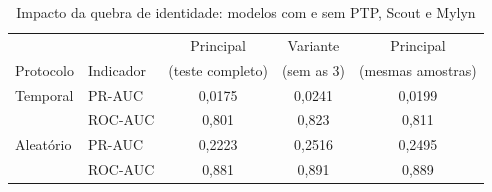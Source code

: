 \begin{table}[htbp]
    \centering
    \footnotesize
    \caption{Impacto da quebra de identidade: modelos com e sem PTP, Scout e Mylyn}
    \label{tab:res-sensibilidade}
    \begin{tabular}{llccc}
        \toprule
        & & Principal & Variante & Principal \\
        Protocolo & Indicador & (teste completo) & (sem as 3) & (mesmas amostras) \\
        \midrule
        Temporal  & PR-AUC  & 0,0175 & 0,0241 & 0,0199 \\
                  & ROC-AUC & 0,801  & 0,823  & 0,811  \\
        \midrule
        Aleatório & PR-AUC  & 0,2223 & 0,2516 & 0,2495 \\
                  & ROC-AUC & 0,881  & 0,891  & 0,889  \\
        \bottomrule
    \end{tabular}
\end{table}%
